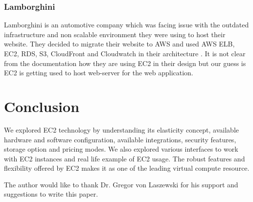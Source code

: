 \subsubsection{Lamborghini}
Lamborghini is an automotive company which was facing issue with the outdated infrastructure and non scalable environment they were using to host their website. They decided to migrate their website to AWS and used AWS ELB, EC2, RDS, S3, CloudFront and Cloudwatch in their architecture \cite{www-aws-ec2-lamborghini}. It is not clear from the documentation how they are using EC2 in their design but our guess is EC2 is getting used to host web-server for the web application.

\section{Conclusion}
We explored EC2 technology by understanding its elasticity concept, available hardware and software configuration, available integrations, security features, storage option and pricing modes. We also explored various interfaces to work with EC2 instances and real life example of EC2 usage. The robust features and flexibility offered by EC2 makes it as one of the leading virtual compute resource.

\begin{acks}

  The author would like to thank Dr. Gregor von Laszewski for his
  support and suggestions to write this paper.

\end{acks}

 

